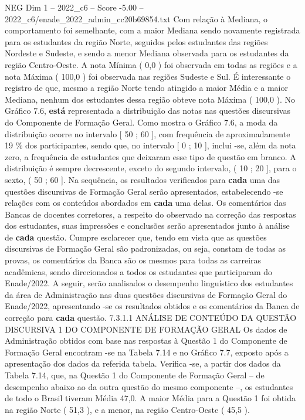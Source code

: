 \begin{textsample}{NEG Dim 1 – 2022\_c6 – Score -5.00 – 2022\_c6/enade\_2022\_admin\_cc20b69854.txt}
Com relação à Mediana, o comportamento foi semelhante, com a maior Mediana sendo novamente registrada para os estudantes da região Norte, seguidos pelos estudantes das regiões Nordeste e Sudeste, e sendo a menor Mediana observada para os estudantes da região Centro-Oeste.
A nota Mínima ( 0,0 ) foi observada em todas as regiões e a nota Máxima ( 100,0 ) foi observada nas regiões Sudeste e Sul.
É interessante o registro de que, mesmo a região Norte tendo atingido a maior Média e a maior Mediana, nenhum dos estudantes dessa região obteve nota Máxima ( 100,0 ).
No Gráfico 7.6, \textbf{está} representada a distribuição das notas nas questões discursivas do Componente de Formação Geral.
Como mostra o Gráfico 7.6, a moda da distribuição ocorre no intervalo [ 50 ; 60 ], com frequência de aproximadamente 19 \% dos participantes, sendo que, no intervalo [ 0 ; 10 ], inclui -se, além da nota zero, a frequência de estudantes que deixaram esse tipo de questão em branco.
A distribuição é sempre decrescente, exceto do segundo intervalo, ( 10 ; 20 ], para o sexto, ( 50 ; 60 ].
Na sequência, os resultados verificados para \textbf{cada} uma das questões discursivas de Formação Geral serão apresentados, estabelecendo -se relações com os conteúdos abordados em \textbf{cada} uma delas.
Os comentários das Bancas de docentes corretores, a respeito do observado na correção das respostas dos estudantes, suas impressões e conclusões serão apresentados junto à análise de \textbf{cada} questão.
Cumpre esclarecer que, tendo em vista que as questões discursivas de Formação Geral são padronizadas, ou seja, constam de todas as provas, os comentários da Banca são os mesmos para todas as carreiras acadêmicas, sendo direcionados a todos os estudantes que participaram do Enade/2022.
A seguir, serão analisados o desempenho linguístico dos estudantes da área de Administração nas duas questões discursivas de Formação Geral do Enade/2022, apresentando -se os resultados obtidos e os comentários da Banca de correção para \textbf{cada} questão. 7.3.1.1 ANÁLISE DE CONTEÚDO DA QUESTÃO DISCURSIVA 1 DO COMPONENTE DE FORMAÇÃO GERAL Os dados de Administração obtidos com base nas respostas à Questão 1 do Componente de Formação Geral encontram -se na Tabela 7.14 e no Gráfico 7.7, exposto após a apresentação dos dados da referida tabela.
Verifica -se, a partir dos dados da Tabela 7.14, que, na Questão 1 do Componente de Formação Geral – de desempenho abaixo ao da outra questão do mesmo componente –, os estudantes de todo o Brasil tiveram Média 47,0.
A maior Média para a Questão 1 foi obtida na região Norte ( 51,3 ), e a menor, na região Centro-Oeste ( 45,5 ).

\end{textsample}
